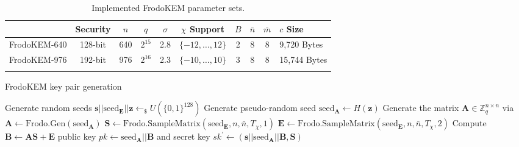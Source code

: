 \begin{table}[tbhp]
\caption{Implemented \textsf{FrodoKEM} parameter sets.}
\label{tab:params}
\begin{center}
\begin{tabular}{l c c c c c c c c x{2cm}}%
\hline \Tstrut

& Security
& $n$
& $q$
& $\sigma$
& {$\chi$ Support}
& $B$
& $\bar{n}$
& $\bar{m}$
& {$c$ Size} \\

\hline \Tstrut
\textsf{FrodoKEM-640} & 128-bit &  640 & {$2^{15}$} & 2.8 & $\{-12,\ldots,12\}$ & 2 & 8 & 8 & {9,720 Bytes} \\ 
\textsf{FrodoKEM-976} & 192-bit & 976 & {$2^{16}$} & 2.3 & $\{-10,\ldots,10\}$ & 3 & 8 & 8 & {15,744 Bytes} \\
\hline \Tstrut
\end{tabular}
\end{center}
\end{table}

 \begin{algorithm}
\caption{FrodoKEM key pair generation} \label{alg:keygen}
   \begin{algorithmic}[1]
    \State Generate random seeds $\mathbf{s} || \text{seed}_\mathbf{E} || \mathbf{z} \leftarrow_\$ U(\{0,1\}^{128})$
        \State Generate pseudo-random seed $\text{seed}_\mathbf{A} \leftarrow H(\mathbf{z})$
    \State Generate the matrix $\mathbf{A} \in \mathbb{Z}^{n \times n}_{q}$ via $\mathbf{A} \leftarrow \text{Frodo.Gen}(\text{seed}_\mathbf{A})$
	\State $\mathbf{S} \leftarrow \text{Frodo.SampleMatrix}(\text{seed}_\mathbf{E},n,\bar{n},T_\chi,1)$
	\State $\mathbf{E} \leftarrow \text{Frodo.SampleMatrix}(\text{seed}_\mathbf{E},n,\bar{n},T_\chi,2)$
	\State Compute $\mathbf{B} \leftarrow \mathbf{AS} + \mathbf{E}$
	\State \Return public key $pk \leftarrow \text{seed}_\mathbf{A} || \mathbf{B} $ and secret key $sk^\prime \leftarrow (\mathbf{s} || \text{seed}_\mathbf{A} || \mathbf{B}, \mathbf{S})$
    \EndProcedure
   \end{algorithmic}
\end{algorithm}

